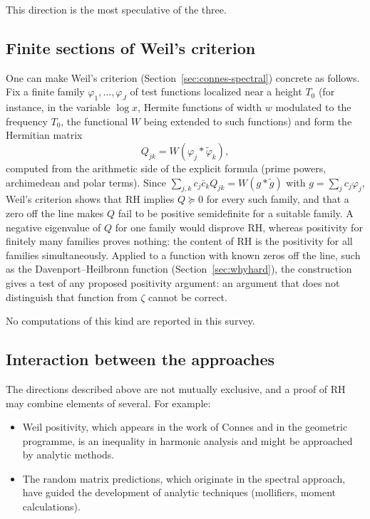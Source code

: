 \documentclass[11pt]{amsart}
\theoremstyle{definition}
\theoremstyle{remark}
\begin{document}
This direction is the most speculative of the three.

\subsection{Finite sections of Weil's criterion}\label{sec:weil-probe}

One can make Weil's criterion (Section~\ref{sec:connes-spectral}) concrete as follows. Fix a finite family $\varphi_1,\dots,\varphi_J$ of test functions localized near a height $T_0$ (for instance, in the variable $\log x$, Hermite functions of width $w$ modulated to the frequency $T_0$, the functional $W$ being extended to such functions) and form the Hermitian matrix
\[
Q_{jk}=W(\varphi_j*\tilde\varphi_k),
\]
computed from the arithmetic side of the explicit formula (prime powers, archimedean and polar terms). Since $\sum_{j,k}c_j\bar c_kQ_{jk}=W(g*\tilde g)$ with $g=\sum_jc_j\varphi_j$, Weil's criterion shows that RH implies $Q\succeq0$ for every such family, and that a zero off the line makes $Q$ fail to be positive semidefinite for a suitable family. A negative eigenvalue of $Q$ for one family would disprove RH, whereas positivity for finitely many families proves nothing: the content of RH is the positivity for all families simultaneously. Applied to a function with known zeros off the line, such as the Davenport--Heilbronn function (Section~\ref{sec:whyhard}), the construction gives a test of any proposed positivity argument: an argument that does not distinguish that function from $\zeta$ cannot be correct.

No computations of this kind are reported in this survey.

\subsection{Interaction between the approaches}\label{sec:interaction}

The directions described above are not mutually exclusive, and a proof of RH may combine elements of several. For example:
\begin{itemize}
\item Weil positivity, which appears in the work of Connes and in the geometric programme, is an inequality in harmonic analysis and might be approached by analytic methods.
\item The random matrix predictions, which originate in the spectral approach, have guided the development of analytic techniques (mollifiers, moment calculations).
\end{itemize}
\end{document}
